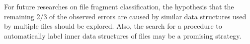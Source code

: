 For future researches on file fragment classification, the hypothesis that the remaining 2/3 of the observed errors are caused by similar data structures used by multiple files should be explored. Also, the search for a procedure to automatically label inner data structures of files may be a promising strategy. 














    
